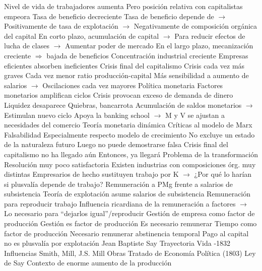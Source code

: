 \documentclass{nuevotema}
\begin{document}
\begin{esquemal}
				\4[] Nivel de vida de trabajadores aumenta
				\4[] Pero posición relativa con capitalistas empeora
				\4[ii] Tasa de beneficio decreciente
				\4[] Tasa de beneficio depende de
				\4[] $\to$ Positivamente de tasa de explotación
				\4[] $\to$ Negativamente de composición orgánica del capital
				\4[] En corto plazo, acumulación de capital
				\4[] $\to$ Para reducir efectos de lucha de clases
				\4[] $\to$ Aumentar poder de mercado
				\4[] En el largo plazo, mecanización creciente
				\4[] $\Rightarrow$ bajada de beneficios
				\4[iii] Concentración industrial creciente
				\4[] Empresas eficientes absorben ineficientes
				\4[$\Rightarrow$] Crisis final del capitalismo
				\4[iv] Crisis cada vez más graves
				\4[] Cada vez menor ratio producción-capital
				\4[] Más sensibilidad a aumento de salarios
				\4[] $\to$ Oscilaciones cada vez mayores
			\3 Política monetaria
				\4 Factores monetarios amplifican ciclos
				\4[] Crisis provocan exceso de demanda de dinero
				\4[] Liquidez desaparece
				\4[] Quiebras, bancarrota
				\4[] Acumulación de saldos monetarios
				\4[] $\to$ Estimulan nuevo ciclo
				\4 Apoya la banking school
				\4[] $\to$ M y V se ajustan a necesidades del comercio
				\4 Teoría monetaria dinámica
		\2 Críticas al modelo de Marx
			\3 Falsabilidad
				\4 Especialmente respecto modelo de crecimiento
				\4 No excluye un estado de la naturaleza futuro
				\4[] Luego no puede demostrarse falsa
				\4 Crisis final del capitalismo no ha llegado aún
				\4[] Entonces, ya llegará
			\3 Problema de la transformación
				\4 Resolución muy poco satisfactoria
				\4 Existen industrias con composiciones órg. muy distintas
				\4 Empresarios de hecho sustituyen trabajo por K
				\4[] $\to$ ¿Por qué lo harían si plusvalía depende de trabajo?
			\3 Remuneración a PMg frente a salarios de subsistencia
				\4 Teoría de explotación asume salarios de subsistencia
				\4[] Remuneración para reproducir trabajo
				\4[] Influencia ricardiana de la remuneración a factores
				\4[] $\to$ Lo necesario para ``dejarlos igual''/reproducir
			\3 Gestión de empresa como factor de producción
				\4 Gestión es factor de producción
				\4 Es necesario remunerar
			\3 Tiempo como factor de producción
				\4 Necesario remunerar abstinencia temporal
				\4 Pago al capital no es plusvalía por explotación
	\1 
		\2 Jean Baptiste Say
			\3 Trayectoria
				\4 Vida
				-1832
				\4 Influencias
				\4[] Smith, Mill, J.S. Mill
				\4 Obras
				\4[] Tratado de Economía Política (1803)
			\3 Ley de Say
				\4 Contexto de enorme aumento de la producción

\end{esquemal}
\end{document}
